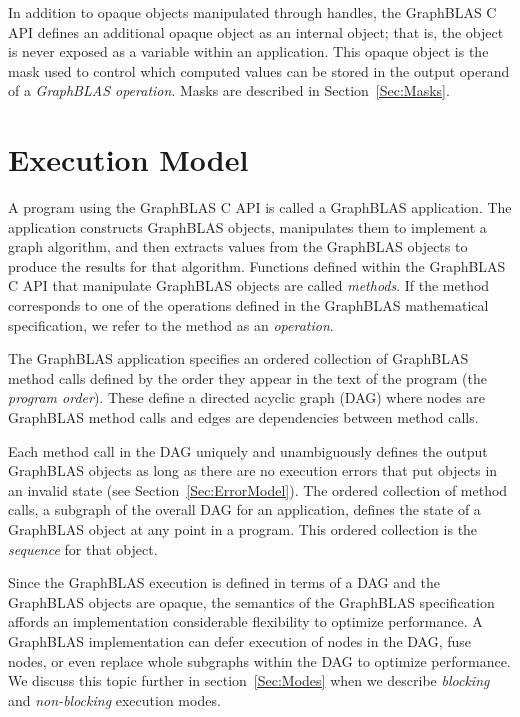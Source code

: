 In addition to opaque objects manipulated through handles, the GraphBLAS C API 
defines an additional opaque object as an internal object; that is, the object 
is never exposed as a variable within an application.  This opaque object is 
the mask used to control which computed values can be stored in the output 
operand of a \emph{GraphBLAS operation}.  Masks are described in 
Section~\ref{Sec:Masks}.


\section{Execution Model}
\label{Sec:ExecutionModel}

A program using the GraphBLAS C API is called
a GraphBLAS application.  The application constructs GraphBLAS objects,
manipulates them to implement a graph algorithm, and then extracts
values from the GraphBLAS objects to produce the results for that algorithm. 
Functions defined within the GraphBLAS C API that manipulate GraphBLAS
objects are called \emph{methods}.  If the method corresponds to one
of the operations defined in the GraphBLAS mathematical specification,
we refer to the method as an \emph{operation}.

The GraphBLAS application specifies an ordered collection of 
GraphBLAS method calls defined by the order
they appear in the text of the program (the \emph{program order}).  
These define a directed acyclic graph (DAG) where nodes are GraphBLAS
method calls and edges are dependencies between method calls.  

Each method call in the DAG uniquely and unambiguously defines the output
GraphBLAS objects as long as there are no execution errors that
put objects in an invalid state (see Section~\ref{Sec:ErrorModel}).
The ordered collection of method calls, a subgraph of the overall DAG for an 
application, defines the state of a GraphBLAS object at any point in a program.  
This ordered collection is the \emph{sequence} for that object.  

Since the GraphBLAS execution is defined in terms of a DAG and the 
GraphBLAS objects are opaque, the semantics of the GraphBLAS specification
affords an implementation considerable flexibility to optimize performance.  A 
GraphBLAS implementation can defer execution of nodes in the DAG, fuse nodes, or 
even replace whole subgraphs within the DAG to optimize performance.  We discuss 
this topic further in section~\ref{Sec:Modes} when we describe 
\emph{blocking} and \emph{non-blocking} execution modes.

